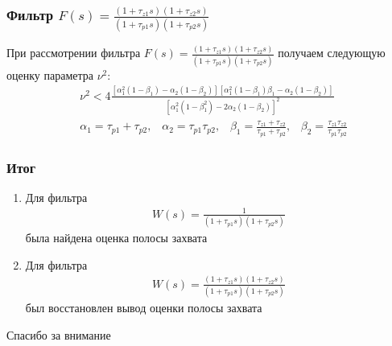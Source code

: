 \documentclass{beamer}
\begin{document}

\begin{frame}
\frametitle{Фильтр $F(s) = \frac{(1+\tau_{z1}s)(1+\tau_{z2}s)}{(1+\tau_{p1}s)(1+\tau_{p2}s)}$}
При рассмотрении фильтра $F(s) = \frac{(1+\tau_{z1}s)(1+\tau_{z2}s)}{(1+\tau_{p1}s)(1+\tau_{p2}s)}$  получаем следующую оценку параметра $\nu^2$:
 \begin{equation*}
 \begin{aligned}
&\nu^2 < 4\frac{[\alpha_1^2(1-\beta_1) - \alpha_2(1-\beta_2)][\alpha_1^2(1-\beta_1)\beta_1 - \alpha_2(1-\beta_2)]}{[\alpha_1^2(1-\beta_1^2) - 2\alpha_2(1-\beta_2)]^2}\\
&\alpha_1 = \tau_{p1} + \tau_{p2}\text{,}\quad 
\alpha_2 = \tau_{p1}\tau_{p2}\text{,}\quad 
\beta_1 = \frac{\tau_{z1}+\tau_{z2}}{\tau_{p1}+\tau_{p2}}\text{,}\quad 
\beta_2 = \frac{\tau_{z1}\tau_{z2}}{\tau_{p1}\tau_{p2}}
 \end{aligned}
\end{equation*}
\end{frame}

\begin{frame}
\frametitle{Итог}
\begin{enumerate}
\item Для фильтра 
 \begin{equation*}
 \begin{aligned}
W(s) = \frac{1}{(1+\tau_{p1}s)(1+\tau_{p2}s)}
 \end{aligned}
\end{equation*} 
была найдена оценка полосы захвата
\item Для фильтра 
 \begin{equation*}
 \begin{aligned}
W(s) = \frac{(1+\tau_{z1}s)(1+\tau_{z2}s)}{(1+\tau_{p1}s)(1+\tau_{p2}s)}
 \end{aligned}
\end{equation*}
был восстановлен вывод оценки полосы захвата
\end{enumerate}
\end{frame}


\begin{frame}
\Huge{\centerline{Спасибо за внимание}}
\end{frame}

\end{document}
